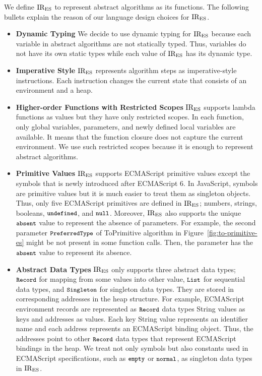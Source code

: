 We define \( \text{IR}_\text{ES} \) to represent abstract algorithms as its functions.
The following bullets explain the reason of our language design choices
for \( \text{IR}_\text{ES} \).

\begin{itemize}
\item \textbf{Dynamic Typing} We decide to use dynamic typing for \( \text{IR}_\text{ES} \)
because each variable in abstract algorithms are not statically typed.
Thus, variables do not have its own static types while each value of \( \text{IR}_\text{ES} \)
has its dynamic type.

\item \textbf{Imperative Style} \( \text{IR}_\text{ES} \) represents algorithm steps
as imperative-style instructions. Each instruction changes the current state
that consists of an environment and a heap.

\item \textbf{Higher-order Functions with Restricted Scopes} \( \text{IR}_\text{ES} \) supports
lambda functions as values but they have only restricted scopes. In each function,
only global variables, parameters, and newly defined local variables are available.
It means that the function closure does not capture the current environment.
We use such restricted scopes because it is enough to represent abstract algorithms.

\item \textbf{Primitive Values} \( \text{IR}_\text{ES} \) supports ECMAScript primitive values except
the symbols that is newly introduced after ECMAScript 6. In JavaScript, symbols are
primitive values but it is much easier to treat them as singleton objects.
Thus, only five ECMAScript primitives are defined in \( \text{IR}_\text{ES} \);
numbers, strings, booleans, \( \texttt{\small undefined} \), and \( \texttt{\small null} \).
Moreover, \( \text{IR}_\text{ES} \) also supports the unique \( \texttt{\small absent} \) value to represent
the absence of parameters. For example, the second parameter \( \texttt{\small PreferredType} \)
of ToPrimitive algorithm in Figure~\ref{fig:to-primitive-es} might be
not present in some function calls. Then, the parameter has the \( \texttt{\small absent} \) value
to represent its absence.

\item \textbf{Abstract Data Types} \( \text{IR}_\text{ES} \) only supports three abstract data types;
\( \texttt{\small Record} \) for mapping from some values into other value,
\( \texttt{\small List} \) for sequential data types,
and \( \texttt{\small Singleton} \) for singleton data types.
They are stored in corresponding addresses in the heap structure.
For example, ECMAScript environment records are represented as \( \texttt{\small Record} \) data types
String values as keys and addresses as values. Each key String value represents an identifier
name and each address represents an ECMAScript binding object.
Thus, the addresses point to other \( \texttt{\small Record} \) data types that represent ECMAScript bindings
in the heap. We treat not only symbols but also constants used in ECMAScript specifications,
such as \( \texttt{\small empty} \) or \( \texttt{\small normal} \), as singleton data types in \( \text{IR}_\text{ES} \).
\end{itemize}

